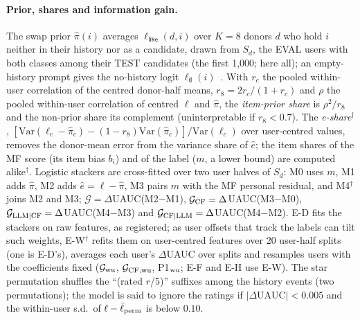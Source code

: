 \paragraph{Prior, shares and information gain.}
The swap prior $\hat\pi(i)$ averages $\ell_{\textsf{like}}(d,i)$ over $K=8$ donors $d$ who hold $i$ neither in their history nor as a
candidate, drawn from $S_d$, the EVAL users with both classes among their TEST candidates (the first 1,000; here all); an
empty-history prompt gives the no-history logit $\ell_\emptyset(i)$~\citep{holtzman2021surface}. With $r_c$ the pooled within-user
correlation of the centred donor-half means, $r_8=2r_c/(1+r_c)$ and $\rho$ the pooled within-user correlation of centred $\ell$ and
$\hat\pi$, the \emph{item-prior share} is $\rho^2/r_8$ and the non-prior share its complement (uninterpretable if $r_8<0.7$). The
\emph{e-share}$^\dagger$, $[\mathrm{Var}(\ell_c-\hat\pi_c)-(1-r_8)\mathrm{Var}(\hat\pi_c)]/\mathrm{Var}(\ell_c)$ over user-centred
values, removes the donor-mean error from the variance share of $\hat e$; the item shares of the MF score (its item bias $b_i$) and
of the label ($m$, a lower bound) are computed alike$^\dagger$. Logistic stackers are cross-fitted over two user halves of $S_d$: M0
uses $m$, M1 adds $\hat\pi$, M2 adds $\hat e=\ell-\hat\pi$, M3 pairs $m$ with the MF personal residual, and M4$^\dagger$ joins M2 and
M3; $\mathcal G=\Delta$UAUC(M2$-$M1), $\mathcal G_{\rm CF}=\Delta$UAUC(M3$-$M0), $\mathcal G_{\rm LLM|CF}=\Delta$UAUC(M4$-$M3) and
$\mathcal G_{\rm CF|LLM}=\Delta$UAUC(M4$-$M2). E-D fits the stackers on raw features, as registered; as user offsets that track the
labels can tilt such weights, E-W$^\dagger$ refits them on user-centred features over 20 user-half splits (one is E-D's), averages
each user's $\Delta$UAUC over splits and resamples users with the coefficients fixed ($\mathcal G_{\rm wu}$, $\mathcal G_{\rm CF,wu}$,
P1$_{\rm wu}$; E-F and E-H use E-W). The star permutation shuffles the ``(rated $r$/5)'' suffixes among the history events (two
permutations); the model is said to ignore the ratings if $|\Delta\mathrm{UAUC}|<0.005$ and the within-user s.d.\ of
$\ell-\bar\ell_{\rm perm}$ is below $0.10$.

